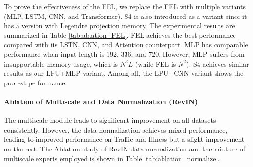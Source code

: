 \documentclass{article}
\begin{document}
%
 To prove the effectiveness of the FEL, we replace the FEL with multiple variants (MLP, LSTM, CNN, and Transformer). S4 is also introduced as a variant since it has a version with Legendre projection memory. The experimental results are summarized in Table \ref{tab:ablation_FEL}. FEL achieves the best performance compared with its LSTN, CNN, and Attention counterpart. MLP has comparable performance when input length is 192, 336, and 720. However, MLP suffers from insupportable memory usage, which is $N^2 L$ (while FEL is $N^2$). S4 achieves similar results as our LPU+MLP variant. Among all, the LPU+CNN variant shows the poorest performance.

\paragraph{Ablation of Multiscale and Data Normalization (RevIN)}

\begin{table*}[h]
\vskip -0.15in
\centering
\caption{Ablation studies of Normalization and Multiscale. Multiscale use 3 branches with: $T$, $2T$, and $4T$ as input sequence length. T is the predicted sequence length}\vspace{-1mm}
\vskip -0.05in
\end{table*}
%
 The multiscale module leads to significant improvement on all datasets consistently. However, the data normalization achieves mixed performance, leading to improved performance on Traffic and Illness but a slight improvement on the rest. The Ablation study of RevIN data normalization and the mixture of multiscale experts employed is shown in Table \ref{tab:ablation_normalize}. 
\end{document}
